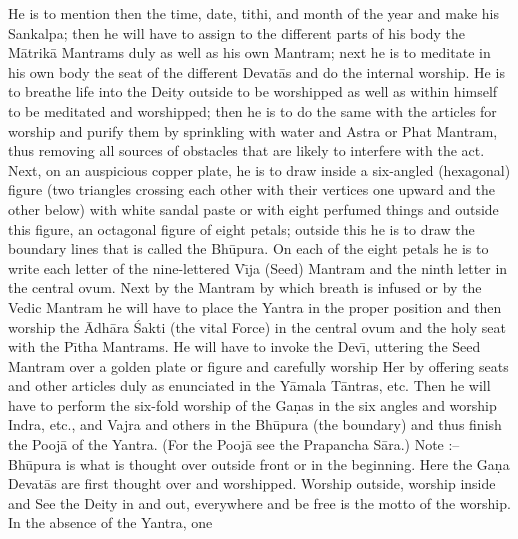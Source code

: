 He is to mention then the time, date, tithi, and month of the year and make his Sankalpa; then he will have to assign to the different parts of his body the M\=atrik\=a Mantrams duly as well as his own Mantram; next he is to meditate in his own body the seat of the different Devat\=as and do the internal worship. He is to breathe life into the Deity outside to be worshipped as well as within himself to be meditated and worshipped; then he is to do the same with the articles for worship and purify them by sprinkling with water and Astra or Phat Mantram, thus removing all sources of obstacles that are likely to interfere with the act. Next, on an auspicious copper plate, he is to draw inside a six-angled (hexagonal) figure (two triangles crossing each other with their vertices one upward and the other below) with white sandal paste or with eight perfumed things and outside this figure, an octagonal figure of eight petals; outside this he is to draw the boundary lines that is called the Bh\=upura. On each of the eight petals he is to write each letter of the nine-lettered V\={\i}ja (Seed) Mantram and the ninth letter in the central ovum. Next by the Mantram by which breath is infused or by the Vedic Mantram he will have to place the Yantra in the proper position and then worship the \=Adh\=ara \'Sakti (the vital Force) in the central ovum and the holy seat with the P\={\i}tha Mantrams. He will have to invoke the Dev\={\i}, uttering the Seed Mantram over a golden plate or figure and carefully worship Her by offering seats and other articles duly as enunciated in the Y\=amala T\=antras, etc. Then he will have to perform the six-fold worship of the Ga\d{n}as in the six angles and worship Indra, etc., and Vajra and others in the Bh\=upura (the boundary) and thus finish the Pooj\=a of the Yantra. (For the Pooj\=a see the Prapancha S\=ara.) Note :-- Bh\=upura is what is thought over outside front or in the beginning. Here the Ga\d{n}a Devat\=as are first thought over and worshipped. Worship outside, worship inside and See the Deity in and out, everywhere and be free is the motto of the worship. In the absence of the Yantra, one

